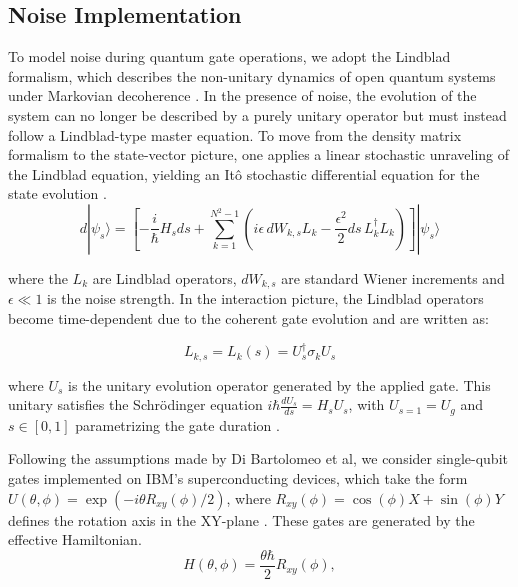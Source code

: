 \documentclass[9pt,a4paper,twocolumn,twoside]{tau-class/tau}
\begin{document}
\subsection{Noise Implementation}
To model noise during quantum gate operations, we adopt the Lindblad formalism, which describes the non-unitary dynamics of open quantum systems under Markovian decoherence \cite{dibartolomeo2023noisy}. In the presence of noise, the evolution of the system can no longer be described by a purely unitary operator but must instead follow a Lindblad-type master equation. To move from the density matrix formalism to the state-vector picture, one applies a linear stochastic unraveling of the Lindblad equation, yielding an Itô stochastic differential equation for the state evolution \cite{dibartolomeo2023noisy}.
\begin{equation}
    d|\psi_s\rangle = \left[ -\frac{i}{\hbar} H_s ds + \sum_{k=1}^{N^2-1} \left( i \epsilon\, dW_{k,s} L_k - \frac{\epsilon^2}{2} ds\, L_k^\dagger L_k \right) \right] |\psi_s\rangle
    \label{eq:stochastic differential equation for modelling noisy quantum gates}
\end{equation}

where the $L_k$ are Lindblad operators, $dW_{k,s}$ are standard Wiener increments and $\epsilon \ll 1 $ is the noise strength. In the interaction picture, the Lindblad operators become time-dependent due to the coherent gate evolution and are written as:

\begin{equation}
    L_{k,s}=L_k(s) = U_s^\dagger \sigma_k U_s
    \label{eq: L_(k_s)}
\end{equation}

where $U_s$ is the unitary evolution operator generated by the applied gate. This unitary satisfies the Schrödinger equation $i\hbar \frac{dU_s}{ds} = H_s U_s$, with $U_{s=1} = U_g$ and $s \in [0,1]$ parametrizing the gate duration \cite{dibartolomeo2023noisy}.

Following the assumptions made by Di Bartolomeo et al, we consider single-qubit gates implemented on IBM’s superconducting devices, which take the form $U(\theta, \phi) = \exp(-i \theta R_{xy}(\phi)/2)$, where $R_{xy}(\phi) = \cos(\phi) X + \sin(\phi) Y$ defines the rotation axis in the XY-plane \cite{dibartolomeo2023noisy}. These gates are generated by the effective Hamiltonian.
\begin{equation}
    H(\theta, \phi) = \frac{\theta \hbar}{2} R_{xy}(\phi),
    \label{eq: H}
\end{equation}
\end{document}
